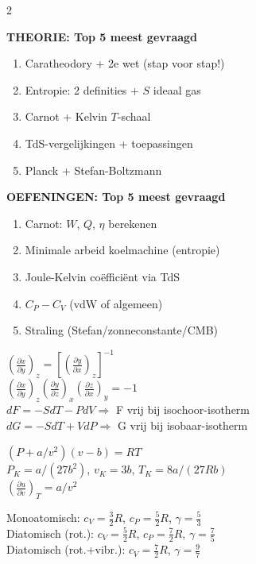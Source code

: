 \documentclass[10pt,a4paper]{article}
\newcommand{\pder}[2]{\left(\frac{\partial #1}{\partial #2}\right)}
\begin{document}
\begin{multicols}{2}

\begin{tip}
\textbf{THEORIE: Top 5 meest gevraagd}
\begin{enumerate}
  \item Caratheodory + 2e wet (stap voor stap!)
  \item Entropie: 2 definities + $S$ ideaal gas
  \item Carnot + Kelvin $T$-schaal
  \item TdS-vergelijkingen + toepassingen
  \item Planck + Stefan-Boltzmann
\end{enumerate}
\end{tip}

\begin{tip}
\textbf{OEFENINGEN: Top 5 meest gevraagd}
\begin{enumerate}
  \item Carnot: $W$, $Q$, $\eta$ berekenen
  \item Minimale arbeid koelmachine (entropie)
  \item Joule-Kelvin coëfficiënt via TdS
  \item $C_P - C_V$ (vdW of algemeen)
  \item Straling (Stefan/zonneconstante/CMB)
\end{enumerate}
\end{tip}

\begin{formulabox}[title=Handige Identiteiten]
$\pder{x}{y}_z = \left[\pder{y}{x}_z\right]^{-1}$\\[4pt]
$\pder{x}{y}_z\pder{y}{z}_x\pder{z}{x}_y = -1$\\[4pt]
$dF = -SdT - PdV \Rightarrow$ F vrij bij isochoor-isotherm\\[4pt]
$dG = -SdT + VdP \Rightarrow$ G vrij bij isobaar-isotherm
\end{formulabox}

\begin{formulabox}[title=Van der Waals]
$(P+a/v^2)(v-b) = RT$\\
$P_K = a/(27b^2)$, $v_K = 3b$, $T_K = 8a/(27Rb)$\\
$\pder{u}{v}_T = a/v^2$
\end{formulabox}

\begin{formulabox}[title=Molaire Warmtecapaciteiten]
Monoatomisch: $c_V = \frac{3}{2}R$, $c_P = \frac{5}{2}R$, $\gamma = \frac{5}{3}$\\
Diatomisch (rot.): $c_V = \frac{5}{2}R$, $c_P = \frac{7}{2}R$, $\gamma = \frac{7}{5}$\\
Diatomisch (rot.+vibr.): $c_V = \frac{7}{2}R$, $\gamma = \frac{9}{7}$
\end{formulabox}


\end{multicols}
\end{document}
